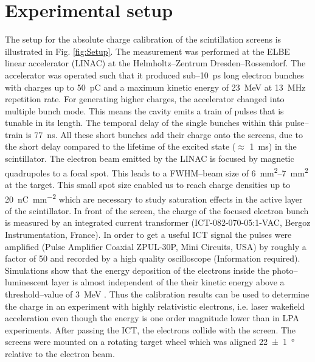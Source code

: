 \documentclass[%
reprint,
amsmath,
amssymb,
aip,
rsi, 
numerical,
floatfix,
]{revtex4-1}
\newcommand{\myCite}[1]{\textcolor{blue}{\cite{#1}}}
\begin{document}
\section{\label{Set} Experimental setup}

The setup for the absolute charge calibration of the scintillation screens is illustrated in Fig. \ref{fig:Setup}.
The measurement was performed at the ELBE linear accelerator (LINAC) at the Helmholtz--Zentrum Dresden--Rossendorf. 
The accelerator was operated such that it produced sub--\SI{10}{\pico\second} long electron bunches with charges up to \SI{50}{\pico\coulomb} and a maximum kinetic energy of \SI{23}{\mega\electronvolt} at \SI{13}{\mega\hertz} repetition rate.  
For generating higher charges, the accelerator changed into multiple bunch mode. 
This means the cavity emits a train of pulses that is tunable in its length.
The temporal delay of the single bunches within this pulse--train is \SI{77}{\nano\second}. 
All these short bunches add their charge onto the screens, due to the short delay compared to the lifetime of the excited state ($\approx$ \SI{1}{\milli\second}) in the scintillator\myCite{Morlotti1997}.
The electron beam emitted by the LINAC is focused by magnetic quadrupoles to a focal spot.
This leads to a FWHM--beam size of \SIrange{6}{7}{\milli\metre^2} at the target.
This small spot size enabled us to reach charge densities up to \SI[per-mode=symbol]{20}{\nano\coulomb \per \square\milli\meter} which are necessary to study saturation effects in the active layer of the scintillator.
In front of the screen, the charge of the focused electron bunch is measured by an integrated current transformer (ICT-082-070-05:1-VAC, Bergoz Instrumentation, France). 
In order to get a useful ICT signal the pulses were amplified (Pulse Amplifier Coaxial ZPUL-30P, Mini Circuits, USA) by roughly a factor of 50 and recorded by a high quality oscilloscope (Information required).
Simulations show that the energy deposition of the electrons inside the photo--luminescent layer is almost independent of the their kinetic energy above a threshold--value of \SI{3}{\mega\electronvolt} \myCite{Hidding2007,Glinec2006,Masuda2008}.
Thus the calibration results can be used to determine the charge in an experiment with highly relativistic electrons, i.e. laser wakefield acceleration even though the energy is one order magnitude lower than in LPA experiments. 
After passing the ICT, the electrons collide with the screen. 
The screens were mounted on a rotating target wheel which was aligned \SI[separate-uncertainty = true]{22(1)}{\degree} relative to the electron beam.
\end{document}
